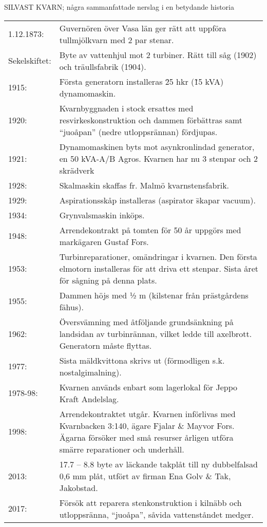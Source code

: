 SILVAST KVARN; några sammanfattade nerslag i en betydande historia
\begin{center}
  \begin{tabular}{l p{}}
    \hline
    1.12.1873: &	Guvernören över Vasa län ger rätt att uppföra tullmjölkvarn med 2 par	stenar. \\
    Sekelskiftet: &	Byte av vattenhjul mot 2 turbiner. Rätt till såg (1902) och träullsfabrik (1904). \\
    1915: &	Första generatorn installeras \= 25 hkr (\~15 kVA) dynamomaskin. \\
    1920: &	Kvarnbyggnaden i stock ersattes med resvirkeskonstruktion och dammen förbättras samt ``juoåpan'' (nedre utloppsrännan) fördjupas. \\
    1921: & Dynamomaskinen byts mot asynkronlindad generator, en 50 kVA-A/B Agros. Kvarnen har nu 3 stenpar och 2 skrädverk \\
    1928: &	Skalmaskin skaffas fr. Malmö kvarnstensfabrik. \\
    1929: &	Aspirationsskåp installeras (aspirator \= skapar vacuum). \\
    1934: &	Grynvalsmaskin inköps. \\
    1948:	&	Arrendekontrakt på tomten för 50 år uppgörs med markägaren Gustaf Fors. \\
    1953: &	Turbinreparationer, omändringar i kvarnen. Den första elmotorn installeras för att driva ett stenpar. Sista året för sågning på denna plats. \\
    1955: &	Dammen höjs med ½ m (kilstenar från prästgårdens fähus). \\
    1962: &	Översvämning med åtföljande grundsänkning på landsidan av turbinrännan, vilket ledde till axelbrott. Generatorn måste flyttas. \\
    1977: &	Sista mäldkvittona skrivs ut (förmodligen s.k. nostalgimalning). \\
    1978-98: & Kvarnen används enbart som lagerlokal för Jeppo Kraft Andelslag. \\
    1998:	&	Arrendekontraktet utgår. Kvarnen införlivas med Kvarnbacken 3:140, ägare Fjalar \& Mayvor Fors. Ägarna försöker med små resurser årligen utföra smärre reparationer och underhåll. \\
    2013:	&	17.7 – 8.8 byte av läckande takplåt till ny dubbelfalsad 0,6 mm plåt, utfört av firman Ena Golv \& Tak, Jakobstad. \\
    2017: & Försök att reparera stenkonstruktion i kilnäbb och utloppsränna, ``juoåpa'', såvida vattenståndet medger. \\
    \hline
  \end{tabular}
\end{center}



